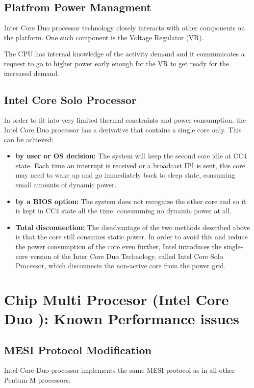\subsection{Platfrom Power Managment}
Inter Core Duo processor technology closely interacts with other components on the platform. One such component is the Voltage Regulator (VR).

The CPU has internal knowledge of the activity demand and it communicates a request to go to higher power early enough for the VR to get ready for the increased demand.

\subsection{Intel Core Solo Processor}
In order to fit into very limited thermal constraints and power consumption, the Intel Core Duo processor has a derivative that contains a single core only. This can be achieved:

\begin{itemize}
	\item \textbf{by user or OS decision: }The system will keep the second core idle at CC4 state. Each time an interrupt is received or a broadcast IPI is sent, this core may need to wake up and go immediately back to sleep state, consuming small amounts of dynamic power.
	\item \textbf{by a BIOS option:} The system does not recognize the other core and so it is kept in CC4 state all the time, consumming no dynamic power at all.
	\item \textbf{Total disconnection:} The disadvantage of the two methods described above is that the core still consumes static power. In order to avoid this and reduce the power consumption of the core even further, Intel introduces the single-core version of the Inter Core Duo Technology, called Intel Core Solo Processor, which disconnects the non-active core from the power grid.
\end{itemize}

\newpage
\section{Chip Multi Procesor (Intel Core Duo \cite{Mendelson:2006:CIS}): Known Performance issues}

\subsection{MESI Protocol Modification}
Intel Core Duo processor implements the same MESI protocol as in all other Pentum M processors.

